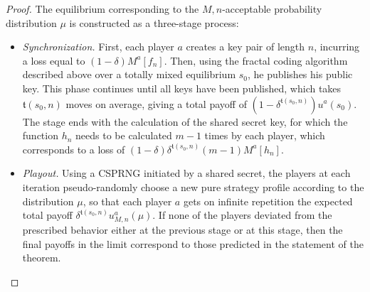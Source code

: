 \begin{proof}[Proof]
	The equilibrium corresponding to the $M,n$-acceptable probability distribution $\mu$ is constructed as a three-stage process: %
	\begin{itemize}
		\item \emph{Synchronization.} First, each player $a$ creates a key pair of length $n$, incurring a loss equal to $(1 - \delta) M^a[f_n]$. Then, using the fractal coding algorithm described above over a totally mixed equilibrium $s_0$, he publishes his public key. This phase continues until all keys have been published, which takes $\mathfrak{t}(s_0, n)$ moves on average, giving a total payoff of $(1 - \delta^{\mathfrak{t}(s_0 , n)}) u^a(s_0)$. The stage ends with the calculation of the shared secret key, for which the function $h_n$ needs to be calculated $m - 1$ times by each player, which corresponds to a loss of $(1 - \delta) \delta^{\mathfrak{t}(s_0, n)} (m - 1) M^a[h_n]$. %
		\item \emph{Playout.} Using a CSPRNG initiated by a shared secret, the players at each iteration pseudo-randomly choose a new pure strategy profile according to the distribution $\mu$, so that each player $a$ gets on infinite repetition the expected total payoff $\delta^{\mathfrak{t}(s_0, n)} u_{M,n}^a(\mu)$. If none of the players deviated from the prescribed behavior either at the previous stage or at this stage, then the final payoffs in the limit correspond to those predicted in the statement of the theorem. %

\end{itemize}
\end{proof}
